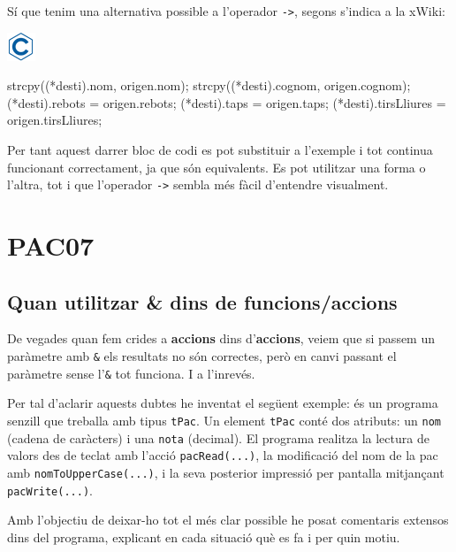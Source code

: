 \documentclass[]{book}
\newenvironment{Shaded}{\begin{snugshade}}{\end{snugshade}}
\newcommand{\NormalTok}[1]{#1}
\begin{document}
Sí que tenim una alternativa possible a l'operador \texttt{-\textgreater{}}, segons s'indica a la xWiki:

\includegraphics{./img/c.png}

\begin{Shaded}
\begin{Highlighting}[]
\NormalTok{    strcpy((*desti).nom, origen.nom);}
\NormalTok{    strcpy((*desti).cognom, origen.cognom);}
\NormalTok{    (*desti).rebots = origen.rebots;}
\NormalTok{    (*desti).taps = origen.taps;}
\NormalTok{    (*desti).tirsLliures = origen.tirsLliures;}
\end{Highlighting}
\end{Shaded}

Per tant aquest darrer bloc de codi es pot substituir a l'exemple i tot continua funcionant correctament, ja que són equivalents. Es pot utilitzar una forma o l'altra, tot i que l'operador \texttt{-\textgreater{}} sembla més fàcil d'entendre visualment.

\hypertarget{pac07}{%
\chapter{PAC07}\label{pac07}}

\hypertarget{quan-utilitzar-dins-de-funcionsaccions}{%
\section{Quan utilitzar \& dins de funcions/accions}\label{quan-utilitzar-dins-de-funcionsaccions}}

De vegades quan fem crides a \textbf{accions} dins d'\textbf{accions}, veiem que si passem un paràmetre amb \texttt{\&} els resultats no són correctes, però en canvi passant el paràmetre sense l'\texttt{\&} tot funciona. I a l'inrevés.

Per tal d'aclarir aquests dubtes he inventat el següent exemple: és un programa senzill que treballa amb tipus \texttt{tPac}. Un element \texttt{tPac} conté dos atributs: un \texttt{nom} (cadena de caràcters) i una \texttt{nota} (decimal). El programa realitza la lectura de valors des de teclat amb l'acció \texttt{pacRead(...)}, la modificació del nom de la pac amb \texttt{nomToUpperCase(...)}, i la seva posterior impressió per pantalla mitjançant \texttt{pacWrite(...)}.

Amb l'objectiu de deixar-ho tot el més clar possible he posat comentaris extensos dins del programa, explicant en cada situació què es fa i per quin motiu.
\end{document}

